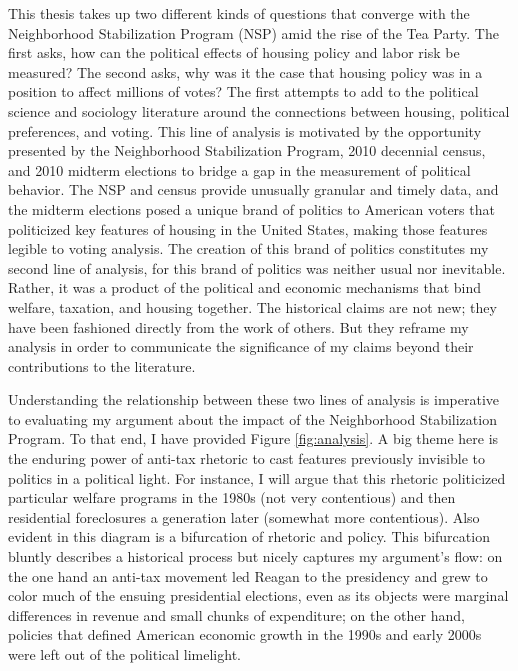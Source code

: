 \documentclass[12pt,oneside]{psthesis}
\begin{document}
This thesis takes up two different kinds of questions that converge with the Neighborhood Stabilization Program (NSP) amid the rise of the Tea Party.
The first asks, how can the political effects of housing policy and labor risk be measured?
The second asks, why was it the case that housing policy was in a position to affect millions of votes?
The first attempts to add to the political science and sociology literature around the connections between housing, political preferences, and voting.
This line of analysis is motivated by the opportunity presented by the Neighborhood Stabilization Program, 2010 decennial census, and 2010 midterm elections to bridge a gap in the measurement of political behavior.
The NSP and census provide unusually granular and timely data, and the midterm elections posed a unique brand of politics to American voters that politicized key features of housing in the United States, making those features legible to voting analysis.
The creation of this brand of politics constitutes my second line of analysis, for this brand of politics was neither usual nor inevitable.
Rather, it was a product of the political and economic mechanisms that bind welfare, taxation, and housing together.
The historical claims are not new; they have been fashioned directly from the work of others.
But they reframe my analysis in order to communicate the significance of my claims beyond their contributions to the literature.

Understanding the relationship between these two lines of analysis is imperative to evaluating my argument about the impact of the Neighborhood Stabilization Program.
To that end, I have provided Figure \ref{fig:analysis}.
A big theme here is the enduring power of anti-tax rhetoric to cast features previously invisible to politics in a political light.
For instance, I will argue that this rhetoric politicized particular welfare programs in the 1980s (not very contentious) and then residential foreclosures a generation later (somewhat more contentious).
Also evident in this diagram is a bifurcation of rhetoric and policy.
This bifurcation bluntly describes a historical process but nicely captures my argument's flow: on the one hand an anti-tax movement led Reagan to the presidency and grew to color much of the ensuing presidential elections, even as its objects were marginal differences in revenue and small chunks of expenditure; on the other hand, policies that defined American economic growth in the 1990s and early 2000s were left out of the political limelight.
\end{document}
